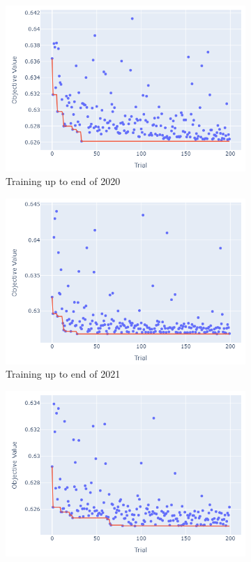 \documentclass[12pt,twoside]{report}
\begin{document}
\begin{figure}[htb]
\begin{subfigure}{.33\linewidth}
  \includegraphics[width=0.95\linewidth]{figures/va_lr_no_odds_cutoff_2020.png}
  \caption{Training up to end of 2020}
\end{subfigure}%
\begin{subfigure}{.33\linewidth}
  \centering
  \includegraphics[width=0.95\linewidth]{figures/va_lr_no_odds_cutoff_2021.png}
  \caption{Training up to end of 2021}
\end{subfigure}
\par\bigskip
\par\bigskip
\begin{subfigure}{.33\linewidth}
  \centering
  \includegraphics[width=0.95\linewidth]{figures/va_lr_no_odds_cutoff_2022.png}

\end{subfigure}
\end{figure}
\end{document}
